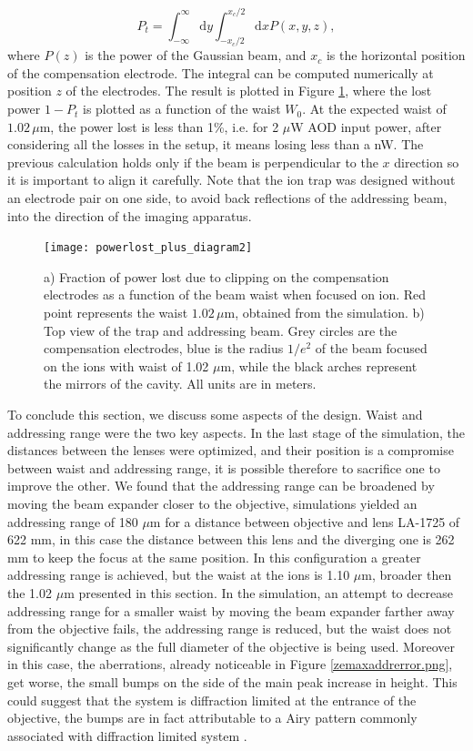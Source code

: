\begin{equation}
P_{t} = \int_{-\infty}^{\infty}\text{d}y \int_{-x_c/2}^{x_c/2}\text{d}x P(x,y,z),
\end{equation}
where $P(z)$ is the power of the Gaussian beam, and $x_c$ is the horizontal position of the compensation electrode. The integral can be computed numerically at position $z$ of the electrodes. The result is plotted in Figure \ref{lossesplot}, where the lost power $1-P_{t}$ is plotted as a function of the waist $W_0$. At the expected waist of $1.02\,\mu$m, the power lost is less than 1\%, i.e. for 2 $\mu$W AOD input power, after considering all the losses in the setup, it means losing less than a nW. The previous calculation holds only if the beam is perpendicular to the $x$ direction so it is important to align it carefully. Note that the ion trap was designed without an electrode pair on one side, to avoid back reflections of the addressing beam, into the direction of the imaging apparatus.\par
\begin{figure}
       \centering
         \texttt{[image: powerlost\_plus\_diagram2]}
         \caption{a) Fraction of power lost due to clipping on the compensation electrodes as a function of the beam waist when focused on ion. Red point represents the waist $1.02\,\mu$m, obtained from the simulation. b) Top view of the trap and addressing beam. Grey circles are the compensation electrodes, blue is the radius $1/e^2$ of the beam focused on the ions with waist of 1.02 $\mu$m, while the black arches represent the mirrors of the cavity. All units are in meters.}
         \label{lossesplot}
 \end{figure}
To conclude this section, we discuss some aspects of the design. Waist and addressing range were the two key aspects. In the last stage of the simulation, the distances between the lenses were optimized, and their position is a compromise between waist and addressing range, it is possible therefore to sacrifice one to improve the other. We found that the addressing range can be broadened by moving the beam expander closer to the objective, simulations yielded an addressing range of 180 $\mu$m for a distance between objective and lens LA-1725 of 622 mm, in this case the distance between this lens and the diverging one is 262 mm to keep the focus at the same position. In this configuration a greater addressing range is achieved, but the waist at the ions is 1.10 $\mu$m, broader then the 1.02 $\mu$m presented in this section. In the simulation, an attempt to decrease addressing range for a smaller waist by moving the beam expander farther away from the objective fails, the addressing range is reduced, but the waist does not significantly change as the full diameter of the objective is being used. Moreover in this case, the aberrations, already noticeable in Figure \ref{zemaxaddrerror.png}, get worse, the small bumps on the side of the main peak increase in height. This could suggest that the system is diffraction limited at the entrance of the objective, the bumps are in fact attributable to a Airy pattern commonly associated with diffraction limited system \cite{dlimited}.
